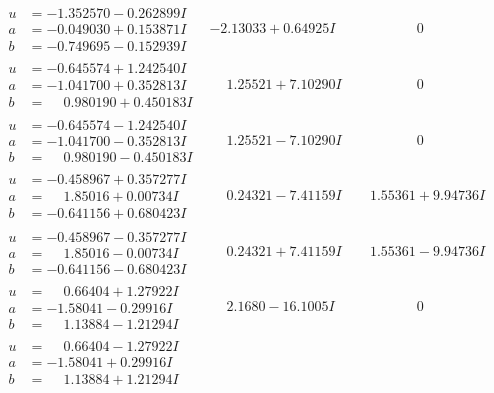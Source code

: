 \documentclass[1p]{elsarticle_modified}
\theoremstyle{definition}
\begin{document}
$$\begin{array}{c|c|c}
\begin{aligned}
u &= -1.352570 - 0.262899 I \\
a &= -0.049030 + 0.153871 I \\
b &= -0.749695 - 0.152939 I\end{aligned}
 & -2.13033 + 0.64925 I & \phantom{-0.000000 } 0 \\ \hline\begin{aligned}
u &= -0.645574 + 1.242540 I \\
a &= -1.041700 + 0.352813 I \\
b &= \phantom{-}0.980190 + 0.450183 I\end{aligned}
 & \phantom{-}1.25521 + 7.10290 I & \phantom{-0.000000 } 0 \\ \hline\begin{aligned}
u &= -0.645574 - 1.242540 I \\
a &= -1.041700 - 0.352813 I \\
b &= \phantom{-}0.980190 - 0.450183 I\end{aligned}
 & \phantom{-}1.25521 - 7.10290 I & \phantom{-0.000000 } 0 \\ \hline\begin{aligned}
u &= -0.458967 + 0.357277 I \\
a &= \phantom{-}1.85016 + 0.00734 I \\
b &= -0.641156 + 0.680423 I\end{aligned}
 & \phantom{-}0.24321 - 7.41159 I & \phantom{-}1.55361 + 9.94736 I \\ \hline\begin{aligned}
u &= -0.458967 - 0.357277 I \\
a &= \phantom{-}1.85016 - 0.00734 I \\
b &= -0.641156 - 0.680423 I\end{aligned}
 & \phantom{-}0.24321 + 7.41159 I & \phantom{-}1.55361 - 9.94736 I \\ \hline\begin{aligned}
u &= \phantom{-}0.66404 + 1.27922 I \\
a &= -1.58041 - 0.29916 I \\
b &= \phantom{-}1.13884 - 1.21294 I\end{aligned}
 & \phantom{-}2.1680 - 16.1005 I & \phantom{-0.000000 } 0 \\ \hline\begin{aligned}
u &= \phantom{-}0.66404 - 1.27922 I \\
a &= -1.58041 + 0.29916 I \\
b &= \phantom{-}1.13884 + 1.21294 I\end{aligned}

\end{array}$$
\end{document}
